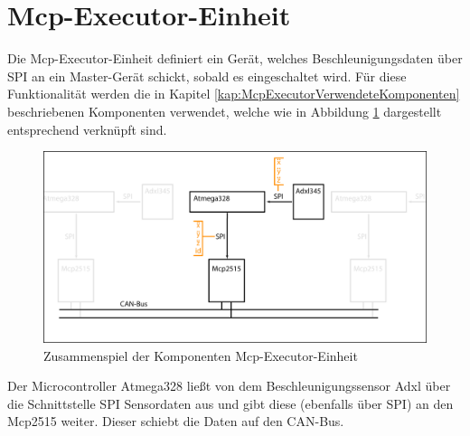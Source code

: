 \section{Mcp-Executor-Einheit}
\label{kap:McpExecutorEinheitMain}
Die Mcp-Executor-Einheit definiert ein Gerät, welches Beschleunigungsdaten über SPI an ein Master-Gerät schickt, sobald es eingeschaltet wird.
\newline
Für diese Funktionalität werden die in Kapitel \ref{kap:McpExecutorVerwendeteKomponenten} beschriebenen Komponenten verwendet, welche wie in Abbildung \ref{fig:Mcp2515EinheitZusammenspiel} dargestellt entsprechend verknüpft sind.

	\begin{figure}[H]
		\centering
		\includegraphics[width=1.0\linewidth]{Bilder/Mcp2515EinheitZusammenspiel}
		\caption[Zusammenspiel der Komponenten Mcp-Executor-Einheit]{Zusammenspiel der Komponenten Mcp-Executor-Einheit}
		\label{fig:Mcp2515EinheitZusammenspiel}
	\end{figure}
	
Der Microcontroller Atmega328 ließt von dem Beschleunigungssensor Adxl über die Schnittstelle SPI Sensordaten aus und gibt diese (ebenfalls über SPI) an den Mcp2515 weiter. Dieser schiebt die Daten auf den CAN-Bus.
	






